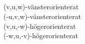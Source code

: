 \subsection{}
	(v,u,w)-vänsterorienterat
	\\
	(-u,v,w)-vänsterorienterat
	\\
	(v,u,-w)-högerorienterat
	\\
	(-w,u,-v)-högerorienterat